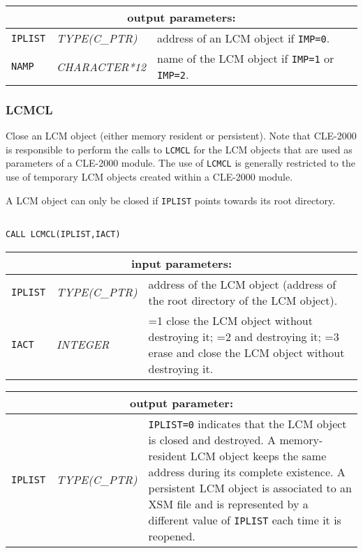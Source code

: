 \vskip 0.8cm

\noindent
\begin{tabular}{|p{1.5cm}|p{3cm}|p{10cm}|}
\hline
\multicolumn{3}{|c|}{\bf output parameters:} \\
\hline
{\tt IPLIST} & {\it TYPE(C\_PTR)} & address of an LCM object if  {\tt IMP=0}. \\
\hline
{\tt NAMP} & {\it CHARACTER*12} & name of the LCM object if {\tt IMP=1} or {\tt IMP=2}. \\
\hline
\end{tabular}

\subsubsection{LCMCL}

Close an LCM object (either memory resident or persistent). Note that CLE-2000 is responsible to perform the calls to
{\tt LCMCL} for the LCM objects that are used as parameters of a CLE-2000 module. The use
of {\tt LCMCL} is generally restricted to the use of temporary LCM objects created within a CLE-2000 module.

\vskip 0.2cm

A LCM object can only be closed if {\tt IPLIST} points towards its root directory.

\begin{verbatim}

CALL LCMCL(IPLIST,IACT)
\end{verbatim}

\noindent
\begin{tabular}{|p{1.5cm}|p{3cm}|p{10cm}|}
\hline
\multicolumn{3}{|c|}{\bf input parameters:} \\
\hline
{\tt IPLIST} & {\it TYPE(C\_PTR)} & address of the LCM object (address of the root directory of the LCM object). \\
\hline
{\tt IACT} & {\it INTEGER} & =1 close the LCM object without destroying it; =2 and destroying it; =3 erase and close the LCM object without destroying it. \\
\hline
\end{tabular}

\vskip 0.8cm

\noindent
\begin{tabular}{|p{1.5cm}|p{3cm}|p{10cm}|}
\hline
\multicolumn{3}{|c|}{\bf output parameter:} \\
\hline
{\tt IPLIST} & {\it TYPE(C\_PTR)} & {\tt IPLIST=0} indicates that the LCM object is closed and destroyed. A memory-resident LCM object keeps the
same address during its complete existence. A persistent LCM object is associated to an XSM file and is represented by a different
value of {\tt IPLIST} each time it is reopened. \\
\hline
\end{tabular}

